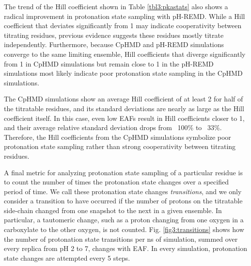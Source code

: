 The trend of the Hill coefficient shown in Table \ref{tbl3:pkastats} also shows
a radical improvement in protonation state sampling with pH-REMD.  While a Hill
coefficient that deviates significantly from 1 may indicate cooperativity
between titrating residues, previous evidence suggests these residues mostly
titrate independently.  \cite{Mongan_JComputChem_2004_v25_p2038}  Furthermore,
because CpHMD and pH-REMD simulations converge to the same limiting ensemble,
Hill coefficients that diverge significantly from 1 in CpHMD simulations but
remain close to 1 in the pH-REMD simulations most likely indicate poor
protonation state sampling in the CpHMD simulations.

The CpHMD simulations show an average Hill coefficient of at least 2 for half of
the titratable residues, and its standard deviations are nearly as large as the
Hill coefficient itself. In this case, even low EAFs result in Hill coefficients
closer to 1, and their average relative standard deviation drops from ~100\% to
~33\%.  Therefore, the Hill coefficients from the CpHMD simulations symbolize
poor protonation state sampling rather than strong cooperativity between
titrating residues.

A final metric for analyzing protonation state sampling of a particular residue
is to count the number of times the protonation state changes over a specified
period of time.  We call these protonation state changes \emph{transitions}, and
we only consider a transition to have occurred if the number of protons on the
titratable side-chain changed from one snapshot to the next in a given ensemble.
In particular, a tautomeric change, such as a proton changing from one oxygen in
a carboxylate to the other oxygen, is not counted. Fig. \ref{fig3:transitions}
shows how the number of protonation state transitions per ns of simulation,
summed over every replica from pH 2 to 7, changes with EAF.  In every
simulation, protonation state changes are attempted every 5 steps.

